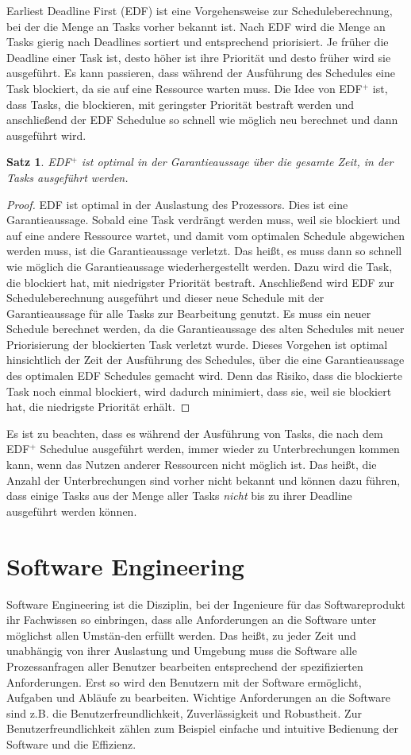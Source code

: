 \documentclass{scrarticle}
\newtheorem{satz}{Satz}[section]
\numberwithin{equation}{section}
\begin{document}
Earliest Deadline First (EDF) ist eine Vorgehensweise zur Scheduleberechnung, bei der die Menge an Tasks vorher bekannt ist. Nach EDF wird die Menge an Tasks gierig nach Deadlines sortiert und entsprechend priorisiert. Je früher die Deadline einer Task ist, desto höher ist ihre Priorität und desto früher wird sie ausgeführt. Es kann passieren, dass während der Ausführung des Schedules eine Task blockiert, da sie auf eine Ressource warten muss. Die Idee von EDF$^+$ ist, dass Tasks, die blockieren, mit geringster Priorität bestraft werden und anschließend der EDF Schedulue so schnell wie möglich neu berechnet und dann ausgeführt wird.
\begin{satz}
	EDF$^+$ ist optimal in der Garantieaussage über die gesamte Zeit, in der Tasks ausgeführt werden.
\end{satz}
\begin{proof}
	EDF ist optimal in der Auslastung des Prozessors. Dies ist eine Garantieaussage. Sobald eine Task verdrängt werden muss, weil sie blockiert und auf eine andere Ressource wartet, und damit vom optimalen Schedule abgewichen werden muss, ist die Garantieaussage verletzt. Das heißt, es muss dann so schnell wie möglich die Garantieaussage wiederhergestellt werden. Dazu wird die Task, die blockiert hat, mit niedrigster Priorität bestraft. Anschließend wird EDF zur Scheduleberechnung ausgeführt und dieser neue Schedule mit der Garantieaussage für alle Tasks zur Bearbeitung genutzt. Es muss ein neuer Schedule berechnet werden, da die Garantieaussage des alten Schedules mit neuer Priorisierung der blockierten Task verletzt wurde. Dieses Vorgehen ist optimal hinsichtlich der Zeit der Ausführung des Schedules, über die eine Garantieaussage des optimalen EDF Schedules gemacht wird. Denn das Risiko, dass die blockierte Task noch einmal blockiert, wird dadurch minimiert, dass sie, weil sie blockiert hat, die niedrigste Priorität erhält.
\end{proof}
Es ist zu beachten, dass es während der Ausführung von Tasks, die nach dem EDF$^+$ Schedulue ausgeführt werden, immer wieder zu Unterbrechungen kommen kann, wenn das Nutzen anderer Ressourcen nicht möglich ist. Das heißt, die Anzahl der Unterbrechungen sind vorher nicht bekannt und können dazu führen, dass einige Tasks aus der Menge aller Tasks \textit{nicht} bis zu ihrer Deadline ausgeführt werden können.

\section{Software Engineering}
Software Engineering ist die Disziplin, bei der Ingenieure für das Softwareprodukt ihr Fachwissen so einbringen, dass alle Anforderungen an die Software unter möglichst allen Umstän-den erfüllt werden. Das heißt, zu jeder Zeit und unabhängig von ihrer Auslastung und Umgebung muss die Software alle Prozessanfragen aller Benutzer bearbeiten entsprechend der spezifizierten Anforderungen. Erst so wird den Benutzern mit der Software ermöglicht, Aufgaben und Abläufe zu bearbeiten. Wichtige Anforderungen an die Software sind z.B. die Benutzerfreundlichkeit, Zuverlässigkeit und Robustheit. Zur Benutzerfreundlichkeit zählen zum Beispiel einfache und intuitive Bedienung der Software und die Effizienz.
\end{document}
